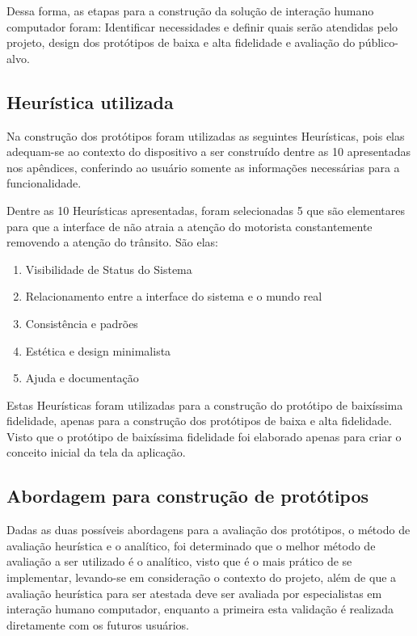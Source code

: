 Dessa forma, as etapas para a construção da solução de interação humano computador foram: Identificar necessidades e definir quais serão atendidas pelo projeto, design dos protótipos de baixa e alta fidelidade e avaliação do público-alvo.
    
\subsection{Heurística utilizada}

Na construção dos protótipos foram utilizadas as seguintes Heurísticas, pois elas adequam-se ao contexto do dispositivo a ser construído dentre as 10 apresentadas nos apêndices, conferindo ao usuário somente as informações necessárias para a funcionalidade.

Dentre as 10 Heurísticas apresentadas, foram selecionadas 5 que são elementares para que a interface de não atraia a atenção do motorista constantemente removendo a atenção do trânsito. São elas:

\begin{enumerate}
	\item Visibilidade de Status do Sistema
	\item Relacionamento entre a interface do sistema e o mundo real
	\item Consistência e padrões
	\item Estética e design minimalista
	\item Ajuda e documentação
\end{enumerate}

Estas Heurísticas foram utilizadas para a construção do protótipo de baixíssima fidelidade, apenas para a construção dos protótipos de baixa e alta fidelidade. Visto que o protótipo de baixíssima fidelidade foi elaborado apenas para criar o conceito inicial da tela da aplicação.

\subsection{Abordagem para construção de protótipos}

 Dadas as duas possíveis abordagens para a avaliação dos protótipos, o método de avaliação heurística e o analítico, foi determinado que o melhor método de avaliação a ser utilizado é o analítico, visto que é o mais prático de se implementar, levando-se em consideração o contexto do projeto, além de que a avaliação heurística para ser atestada deve ser avaliada por especialistas em interação humano computador, enquanto a primeira esta validação é realizada diretamente com os futuros usuários.

